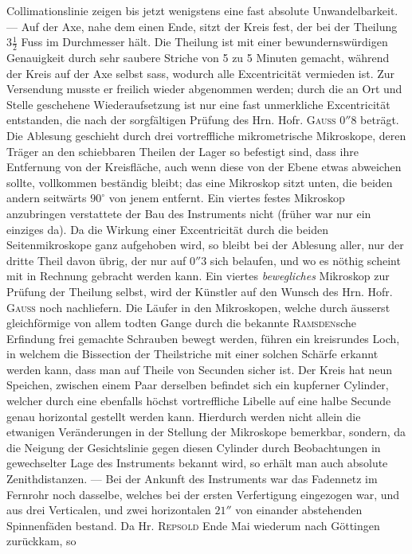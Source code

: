 Collimationslinie zeigen bis jetzt wenigstens eine fast absolute Unwandelbarkeit. --- Auf der Axe,
nahe dem einen Ende, sitzt der Kreis fest, der bei der Theilung $3\frac{1}{2}$ Fuss im Durchmesser hält.
Die Theilung ist mit einer bewundernswürdigen Genauigkeit durch sehr saubere Striche von 5 zu 5
Minuten gemacht, während der Kreis auf der Axe selbst sass, wodurch alle Excentricität vermieden ist.
Zur Versendung musste er freilich wieder abgenommen werden; durch die an Ort und Stelle geschehene
Wiederaufsetzung ist nur eine fast unmerkliche Excentricität entstanden, die nach der sorgfältigen
Prüfung des Hrn. Hofr. \textsc{Gauss} $0''8$ beträgt. Die Ablesung geschieht durch drei vortreffliche
mikrometrische Mikroskope, deren Träger an den schiebbaren Theilen der Lager so befestigt sind, dass
ihre Entfernung von der Kreisfläche, auch wenn diese von der Ebene etwas abweichen sollte,
vollkommen beständig bleibt; das eine Mikroskop sitzt unten, die beiden andern seitwärts $90^\circ$
von jenem entfernt. Ein viertes festes Mikroskop anzubringen verstattete der Bau des Instruments nicht
(früher war nur ein einziges da). Da die Wirkung einer Excentricität durch die beiden Seitenmikroskope
ganz aufgehoben wird, so bleibt bei der Ablesung aller, nur der dritte Theil davon übrig, der nur auf
$0''3$ sich belaufen, und wo es nöthig scheint mit in Rechnung gebracht werden kann. Ein viertes
\emph{bewegliches} Mikroskop zur Prüfung der Theilung selbst, wird der Künstler auf den Wunsch des Hrn.
Hofr. \textsc{Gauss} noch nachliefern. Die Läufer in den Mikroskopen, welche durch äusserst
gleichförmige von allem todten Gange durch die bekannte \textsc{Ramsden}sche Erfindung frei gemachte
Schrauben bewegt werden, führen ein kreisrundes Loch, in welchem die Bissection der Theilstriche mit
einer solchen Schärfe erkannt werden kann, dass man auf Theile von Secunden sicher ist. Der Kreis hat
neun Speichen, zwischen einem Paar derselben befindet sich ein kupferner Cylinder, welcher durch eine
ebenfalls höchst vortreffliche Libelle auf eine halbe Secunde genau horizontal gestellt werden kann.
Hierdurch werden nicht allein die etwanigen Veränderungen in der Stellung der Mikroskope bemerkbar,
sondern, da die Neigung der Gesichtslinie gegen diesen Cylinder durch Beobachtungen in gewechselter
Lage des Instruments bekannt wird, so erhält man auch absolute Zenithdistanzen. --- Bei der Ankunft
des Instruments war das Fadennetz im Fernrohr noch dasselbe, welches bei der ersten Verfertigung
eingezogen war, und aus drei Verticalen, und zwei horizontalen $21''$ von einander abstehenden
Spinnenfäden bestand. Da Hr. \textsc{Repsold} Ende Mai wiederum nach Göttingen zurückkam, so
